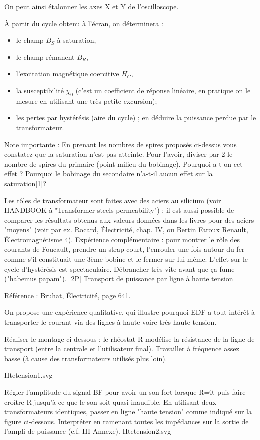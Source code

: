 \documentclass{article}%
\begin{document}
On peut ainsi étalonner les axes X et Y de l'oscilloscope.

À partir du cycle obtenu à l'écran, on déterminera :
\begin{itemize}
	\item    le champ $B_S$ à saturation,
	\item    le champ rémanent $B_R$,
	\item    l'excitation magnétique coercitive $H_C$,
	\item    la susceptibilité $\chi_0$ (c'est un coefficient de réponse linéaire, en pratique on le mesure en utilisant une très petite excursion);
	\item    les pertes par hystérésis (aire du cycle) ; en déduire la puissance perdue par le transformateur.
\end{itemize}

Note importante : En prenant les nombres de spires proposés ci-dessus vous constatez que la saturation n'est pas atteinte. Pour l'avoir, diviser par 2 le nombre de spires du primaire (point milieu du bobinage). Pourquoi a-t-on cet effet ? Pourquoi le bobinage du secondaire n'a-t-il aucun effet sur la saturation[1]?

Les tôles de transformateur sont faites avec des aciers au silicium (voir HANDBOOK à "Transformer steels permeability") ; il est aussi possible de comparer les résultats obtenus aux valeurs données dans les livres pour des aciers "moyens" (voir par ex. Rocard, Électricité, chap. IV, ou Bertin Faroux Renault, Électromagnétisme 4).
Expérience complémentaire : pour montrer le rôle des courants de Foucault, prendre un strap court, l'enrouler une fois autour du fer comme s'il constituait une 3ème bobine et le fermer sur lui-même. L'effet sur le cycle d'hystérésis est spectaculaire. Débrancher très vite avant que ça fume ("habemus papam").
[2P] Transport de puissance par ligne à haute tension

Référence : Bruhat, Électricité, page 641.

On propose une expérience qualitative, qui illustre pourquoi EDF a tout intérêt à transporter le courant via des lignes à haute voire très haute tension.

Réaliser le montage ci-dessous : le rhéostat R modélise la résistance de la ligne de transport (entre la centrale et l'utilisateur final). Travailler à fréquence assez basse (à cause des transformateurs utilisés plus loin).

Htetension1.svg

Régler l'amplitude du signal BF pour avoir un son fort lorsque R=0, puis faire croître R jusqu'à ce que le son soit quasi inaudible. En utilisant deux transformateurs identiques, passer en ligne "haute tension" comme indiqué sur la figure ci-dessous. Interpréter en ramenant toutes les impédances sur la sortie de l'ampli de puissance (c.f. III Annexe).
Htetension2.svg
\end{document}
